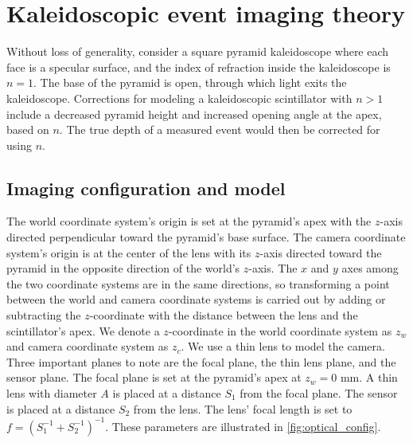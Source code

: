 
\section{Kaleidoscopic event imaging theory} \label{sec:theory}

Without loss of generality, consider a square pyramid kaleidoscope where each 
face is a specular surface, 
and the index of refraction inside the kaleidoscope is $n=1$.
The base of the pyramid is open, through which light exits the kaleidoscope.
Corrections for modeling a kaleidoscopic scintillator with $n>1$ include 
a decreased pyramid height and increased opening angle at the apex, based on $n$.
The true depth of a measured event would then be corrected for using $n$.

\subsection{Imaging configuration and model}

The world coordinate system's origin is set at the pyramid's apex with the 
$z$-axis directed perpendicular toward the pyramid's base surface.
The camera coordinate system's origin is at the center of the lens with its 
$z$-axis directed toward the pyramid in the opposite direction of the world's $z$-axis.
The $x$ and $y$ axes among the two coordinate systems are in the same directions, 
so transforming a point between the world and camera coordinate systems is 
carried out by adding or subtracting the $z$-coordinate with the distance between 
the lens and the scintillator's apex.
We denote a $z$-coordinate in the world coordinate system as $z_w$ and camera 
coordinate system as $z_c$.
We use a thin lens to model the camera.
Three important planes to note are the focal plane, the thin lens plane, and the 
sensor plane.
The focal plane is set at the pyramid's apex at $z_w=0$ mm.
A thin lens with diameter $A$ is placed at a distance $S_1$ from the focal plane. 
The sensor is placed at a distance $S_2$ from the lens.
The lens' focal length is set to $f=(S_1^{-1}+S_2^{-1})^{-1}$.
These parameters are illustrated in \cref{fig:optical_config}.


